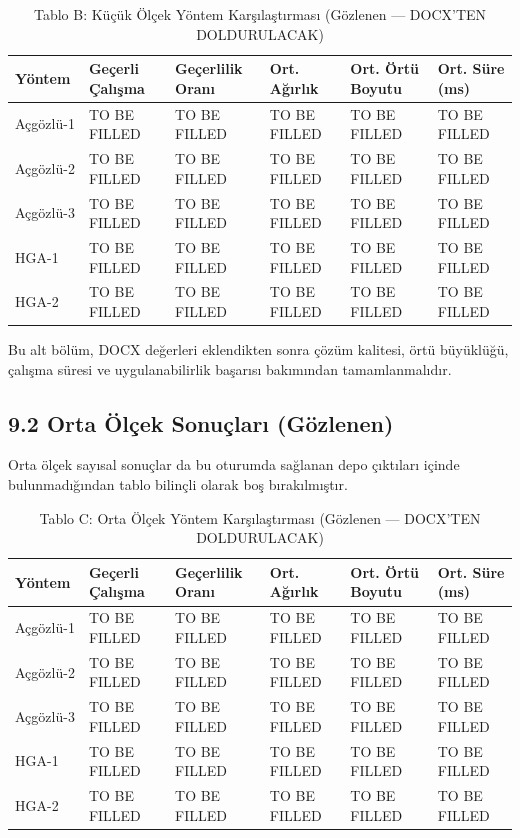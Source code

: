 \documentclass[11pt]{article}
\begin{document}
\begin{table}[h]
\centering
\caption{Tablo B: Küçük Ölçek Yöntem Karşılaştırması (Gözlenen --- DOCX'TEN DOLDURULACAK)}
\label{tab:small-results-tr}
\begin{tabular}{llllll}
\toprule
Yöntem & Geçerli Çalışma & Geçerlilik Oranı & Ort. Ağırlık & Ort. Örtü Boyutu & Ort. Süre (ms) \\
\midrule
Açgözlü-1 & TO BE FILLED & TO BE FILLED & TO BE FILLED & TO BE FILLED & TO BE FILLED \\
Açgözlü-2 & TO BE FILLED & TO BE FILLED & TO BE FILLED & TO BE FILLED & TO BE FILLED \\
Açgözlü-3 & TO BE FILLED & TO BE FILLED & TO BE FILLED & TO BE FILLED & TO BE FILLED \\
HGA-1 & TO BE FILLED & TO BE FILLED & TO BE FILLED & TO BE FILLED & TO BE FILLED \\
HGA-2 & TO BE FILLED & TO BE FILLED & TO BE FILLED & TO BE FILLED & TO BE FILLED \\
\bottomrule
\end{tabular}
\end{table}

Bu alt bölüm, DOCX değerleri eklendikten sonra çözüm kalitesi, örtü büyüklüğü, çalışma süresi ve uygulanabilirlik başarısı bakımından tamamlanmalıdır.

\subsection*{9.2 Orta Ölçek Sonuçları (Gözlenen)}

Orta ölçek sayısal sonuçlar da bu oturumda sağlanan depo çıktıları içinde bulunmadığından tablo bilinçli olarak boş bırakılmıştır.

\begin{table}[h]
\centering
\caption{Tablo C: Orta Ölçek Yöntem Karşılaştırması (Gözlenen --- DOCX'TEN DOLDURULACAK)}
\label{tab:medium-results-tr}
\begin{tabular}{llllll}
\toprule
Yöntem & Geçerli Çalışma & Geçerlilik Oranı & Ort. Ağırlık & Ort. Örtü Boyutu & Ort. Süre (ms) \\
\midrule
Açgözlü-1 & TO BE FILLED & TO BE FILLED & TO BE FILLED & TO BE FILLED & TO BE FILLED \\
Açgözlü-2 & TO BE FILLED & TO BE FILLED & TO BE FILLED & TO BE FILLED & TO BE FILLED \\
Açgözlü-3 & TO BE FILLED & TO BE FILLED & TO BE FILLED & TO BE FILLED & TO BE FILLED \\
HGA-1 & TO BE FILLED & TO BE FILLED & TO BE FILLED & TO BE FILLED & TO BE FILLED \\
HGA-2 & TO BE FILLED & TO BE FILLED & TO BE FILLED & TO BE FILLED & TO BE FILLED \\
\bottomrule
\end{tabular}
\end{table}
\end{document}
